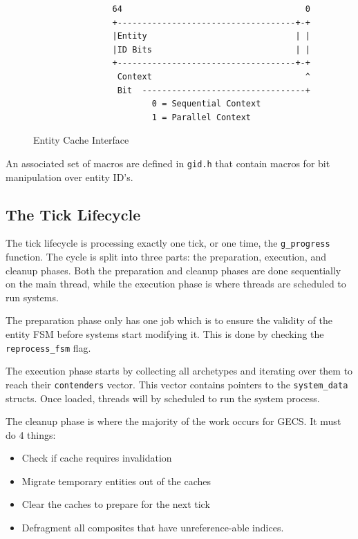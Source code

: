 \begin{figure}[H]
\begin{verbatim}
                64                                     0                                
                +------------------------------------+-+                                
                |Entity                              | |                                
                |ID Bits                             | |                                
                +------------------------------------+-+                                
                 Context                               ^                                
                 Bit  ---------------------------------+                                
                        0 = Sequential Context                                        
                        1 = Parallel Context                                          
\end{verbatim}
\caption{Entity Cache Interface}
\label{code:component_retrieval}
\end{figure}

An associated set of macros are defined in \texttt{gid.h} that contain macros for bit manipulation over entity ID's.

\subsection{The Tick Lifecycle}
The tick lifecycle is processing exactly one tick, or one time, the \texttt{g\_progress} function. The cycle is split into three parts: the preparation, execution, and cleanup phases. Both the preparation and cleanup phases are done sequentially on the main thread, while the execution phase is where threads are scheduled to run systems.

The preparation phase only has one job which is to ensure the validity of the entity FSM before systems start modifying it. This is done by checking the \texttt{reprocess\_fsm} flag.

The execution phase starts by collecting all archetypes and iterating over them to reach their \texttt{contenders} vector. This vector contains pointers to the \texttt{system\_data} structs. Once loaded, threads will by scheduled to run the system process.

The cleanup phase is where the majority of the work occurs for GECS. It must do 4 things:
\begin{itemize}
    \item Check if cache requires invalidation
    \item Migrate temporary entities out of the caches
    \item Clear the caches to prepare for the next tick
    \item Defragment all composites that have unreference-able indices.
\end{itemize}

